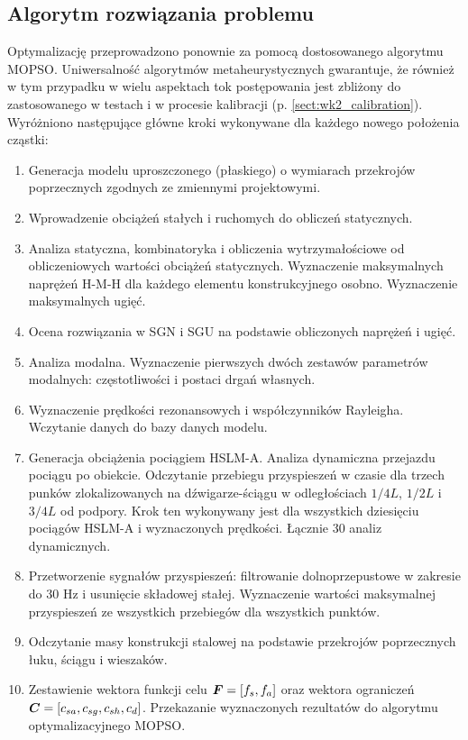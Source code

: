 \subsection{Algorytm rozwiązania problemu}
Optymalizację przeprowadzono ponownie za pomocą dostosowanego algorytmu MOPSO. Uniwersalność algorytmów metaheurystycznych gwarantuje, że również w tym przypadku w wielu aspektach tok postępowania jest zbliżony do zastosowanego w testach i w procesie kalibracji (p. \ref{sect:wk2_calibration}). Wyróżniono następujące główne kroki wykonywane dla każdego nowego położenia cząstki:
\begin{enumerate}[noitemsep]
	\item Generacja modelu uproszczonego (płaskiego) o wymiarach przekrojów poprzecznych zgodnych ze zmiennymi projektowymi.
	\item Wprowadzenie obciążeń stałych i ruchomych do obliczeń statycznych.
	\item Analiza statyczna, kombinatoryka i obliczenia wytrzymałościowe od obliczeniowych wartości obciążeń statycznych. Wyznaczenie maksymalnych naprężeń H-M-H dla każdego elementu konstrukcyjnego osobno. Wyznaczenie maksymalnych ugięć.
	\item Ocena rozwiązania w SGN i SGU na podstawie obliczonych naprężeń i ugięć.
	\item Analiza modalna. Wyznaczenie pierwszych dwóch zestawów parametrów modalnych: częstotliwości i postaci drgań własnych.
	\item Wyznaczenie prędkości rezonansowych i współczynników Rayleigha. Wczytanie danych do bazy danych modelu.
	\item Generacja obciążenia pociągiem HSLM-A. Analiza dynamiczna przejazdu pociągu po obiekcie. Odczytanie przebiegu przyspieszeń w czasie dla trzech punków zlokalizowanych na dźwigarze-ściągu w odległościach $1/4L$, $1/2L$ i $3/4L$ od podpory. Krok ten wykonywany jest dla wszystkich dziesięciu pociągów HSLM-A i wyznaczonych prędkości. Łącznie 30 analiz dynamicznych.
	\item Przetworzenie sygnałów przyspieszeń: filtrowanie dolnoprzepustowe w zakresie do 30 Hz i usunięcie składowej stałej. Wyznaczenie wartości maksymalnej przyspieszeń ze wszystkich przebiegów dla wszystkich punktów.
	\item Odczytanie masy konstrukcji stalowej na podstawie przekrojów poprzecznych łuku, ściągu i wieszaków.
	\item Zestawienie wektora funkcji celu $\bm{F}=[f_s,f_a]$ oraz wektora ograniczeń $\bm{C}=[c_{sa}, c_{sg}, c_{sh}, c_d]$. Przekazanie wyznaczonych rezultatów do algorytmu optymalizacyjnego MOPSO.
\end{enumerate}

